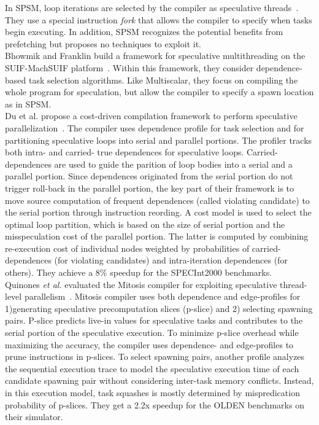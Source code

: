 \documentclass[10pt]{report}          %
\begin{document}
In SPSM, loop iterations are selected by the compiler as speculative threads~\cite{SPSM}. They use a special instruction \textit{fork} that allows the compiler to specify when tasks begin executing. In addition, SPSM recognizes the potential benefits from prefetching but proposes no techniques to exploit it. \\
Bhowmik and Franklin build a framework for speculative multithreading on the SUIF-MachSUIF platform~\cite{bhowmik}. Within this framework, they consider dependence-based task selection algorithms. Like Multiscalar, they focus on compiling the whole program for speculation, but allow the compiler to specify a spawn
location as in SPSM.\\
Du et al. propose a cost-driven compilation framework to perform speculative parallelization~\cite{du_spec}. The compiler uses dependence profile for task selection and for partitioning speculative loops into serial and parallel portions. The profiler tracks both intra- and carried- true dependences for speculative loops. Carried-dependences are used to guide the parition of loop bodies into a serial and a parallel portion. Since dependences originated from the serial portion do not trigger roll-back in the parallel portion, the key part of their framework is to move source computation of frequent dependences (called violating candidate) to the serial portion through instruction reording. A cost model is used to select the optimal loop partition, which is based on the size of serial portion and the misspeculation cost of the parallel portion. The latter is computed by combining re-execution cost of individual nodes weighted by probabilities of carried-dependences (for violating candidates) and intra-iteration dependences (for others).  They achieve a 8\% speedup for the SPECInt2000 benchmarks.\\
Quinones \textit{et al.} evaluated the Mitosis compiler for exploiting speculative thread-level parallelism~\cite{mitosis}.  Mitosis compiler uses both dependence and edge-profiles for 1)generating speculative precomputation slices (p-slice) and 2) selecting spawning pairs. P-slice predicts live-in values for speculative tasks and contributes to the serial portion of the speculative execution. To minimize p-slice overhead while maximizing the accuracy, the compiler uses dependence- and edge-profiles to prune instructions in p-slices. To select spawning pairs, another profile analyzes the sequential execution trace to model the speculative execution time of each candidate spawning pair without considering inter-task memory conflicts. Instead, in this execution model, task squashes is mostly determined by mispredication probability of p-slices. They get a 2.2x speedup for the OLDEN benchmarks on their simulator.\\
\end{document}
